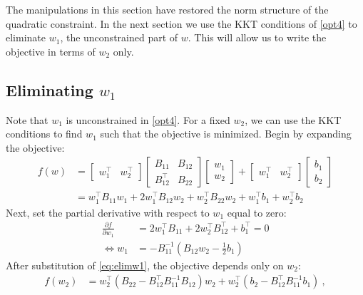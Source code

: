 \documentclass[conference]{IEEEtran}
\begin{document}
The manipulations in this section have restored the norm structure of the quadratic constraint. In the next section we use the KKT conditions of \eqref{opt4} to eliminate $w_1$, the unconstrained part of $w$. This will allow us to write the objective in terms of $w_2$ only.

\subsection{Eliminating $w_1$}

Note that $w_1$ is unconstrained in \eqref{opt4}. For a fixed $w_2$, we can use the KKT
conditions to find $w_1$ such that the objective is minimized. Begin by
expanding the objective:
\begin{align*} f(w) &=
\begin{bmatrix} w_1^\top & w_2^\top \end{bmatrix}
\begin{bmatrix} B_{11} & B_{12} \\ B_{12}^\top & B_{22}\end{bmatrix}
\begin{bmatrix} w_1 \\ w_2 \end{bmatrix} + 
\begin{bmatrix} w_1^\top & w_2^\top \end{bmatrix}
\begin{bmatrix} b_1 \\ b_2\end{bmatrix} \\
&=
w_1^\top B_{11}w_1 + 2w_1^\top B_{12}w_2 + w_2^\top B_{22}w_2 + w_1^\top b_1 + w_2^\top b_2
\end{align*}
Next, set the partial derivative with respect to $w_1$ equal to zero:
\begin{align}
\nonumber \frac{\partial f}{\partial w_1} &= 2w_1^\top B_{11} + 2w_2^\top B_{12}^\top + b_1^\top = 0 \\
\label{eq:elimw1} \iff w_1 &= -B_{11}^{-1}\left(B_{12}w_2 - \frac{1}{2}b_1 \right)
\end{align}
After substitution of \eqref{eq:elimw1}, the objective depends only on $w_2$:
\begin{align*}
f(w_2) &= w_2^\top\left(B_{22} - B_{12}^\top B_{11}^{-1} B_{12}\right)w_2 + 
w_2^\top (b_2 - B_{12}^\top B_{11}^{-1}b_1)~,
\end{align*}
\end{document}
